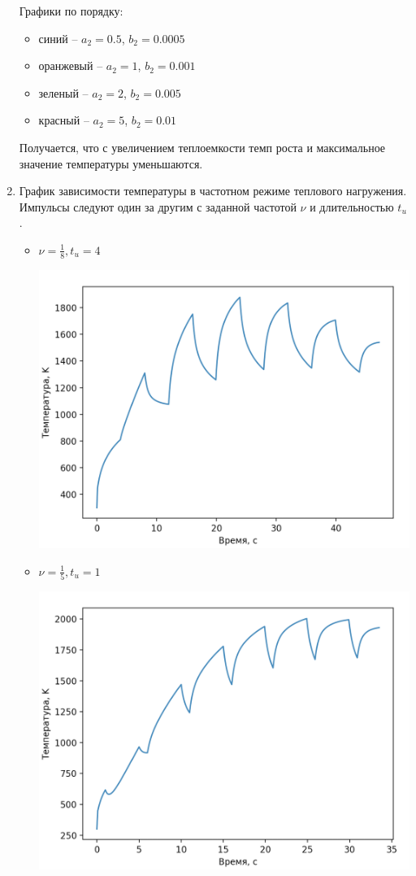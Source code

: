 \documentclass[a4paper,14pt]{extreport} %
\begin{document}
\begin{enumerate}
Графики по порядку:
\begin{itemize}
\item синий -- $a_2=0.5$, $b_2=0.0005$
\item оранжевый -- $a_2=1$, $b_2=0.001$
\item зеленый -- $a_2=2$, $b_2=0.005$
\item красный -- $a_2=5$, $b_2=0.01$
\end{itemize}

Получается, что с увеличением теплоемкости темп роста и максимальное значение температуры уменьшаются. 

\newpage

\item График зависимости температуры в частотном режиме теплового нагружения. Импульсы следуют один за другим с заданной частотой $\nu$ и длительностью $t_u$. 

\begin{itemize}
\item $\nu=\frac{1}{8}, t_u=4$

\includegraphics[scale=0.7]{8}

\newpage

\item $\nu=\frac{1}{5}, t_u=1$

\includegraphics[scale=0.7]{9}


\end{itemize}
\end{enumerate}
\end{document}
